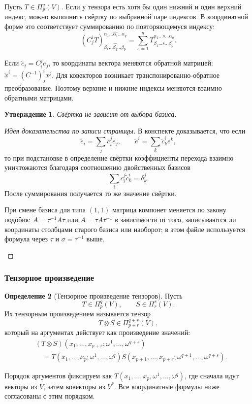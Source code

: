 \documentclass[12pt,a4paper]{article}
\theoremstyle{definition}
\newtheorem{definition}{Определение}[section]
\theoremstyle{plain}
\newtheorem{proposition}[definition]{Утверждение}
\theoremstyle{remark}
\newenvironment{knowledgefix}{\begin{clarifybox}}{\end{clarifybox}}
\newcommand{\Tens}[2]{\Pi^{#2}_{#1}(V)}
\begin{document}
Пусть $T\in\Tens{p}{q}$. Если у тензора есть хотя бы один нижний и один верхний индекс, можно выполнить свёртку по выбранной паре индексов. В координатной форме это соответствует суммированию по повторяющемуся индексу:
\[
    (C^i_j T)^{\alpha_1\ldots \widehat{\alpha_i}\ldots \alpha_q}_{\beta_1\ldots \widehat{\beta_j}\ldots \beta_p}
    =
    \sum_{s=1}^{n}
    T^{\alpha_1\ldots s\ldots \alpha_q}_{\beta_1\ldots s\ldots \beta_p}.
\]
\begin{knowledgefix}
Если \(\tilde e_i=C^j_i e_j\), то координаты вектора меняются обратной матрицей: \(\tilde x^i=(C^{-1})^i_jx^j\). Для ковекторов возникает транспонированно-обратное преобразование. Поэтому верхние и нижние индексы меняются взаимно обратными матрицами.
\end{knowledgefix}

\begin{proposition}
Свёртка не зависит от выбора базиса.
\end{proposition}

\begin{proof}[Идея доказательства по записи страницы]
В конспекте доказывается, что если
\[
    \tilde e_i=\sum_j c_i^j e_j,
    \qquad
    \tilde e^i=\sum_k \tilde c^i_k e^k,
\]
то при подстановке в определение свёртки коэффициенты перехода взаимно уничтожаются благодаря соотношению двойственных базисов
\[
    \sum_i c_i^j\tilde c^i_k=\delta^j_k.
\]
После суммирования получается то же значение свёртки.
\begin{knowledgefix}
При смене базиса для типа \((1,1)\) матрица компонет меняется по закону подобия: \(\widetilde A=\tau^{-1}A\tau\) или \(\widetilde A=\tau A\tau^{-1}\) в зависимости от того, записываются ли координаты столбцами старого базиса или наоборот; в этом файле используется формула через \(\tau\) и \(\sigma=\tau^{-1}\) выше.
\end{knowledgefix}
\end{proof}

\subsubsection*{Тензорное произведение}

\begin{definition}[Тензорное произведение тензоров]
Пусть
\[
    T\in \Tens{p}{q},\qquad S\in \Pi^{s}_{r}(V).
\]
Их тензорным произведением называется тензор
\[
    T\otimes S\in \Pi^{q+s}_{p+r}(V),
\]
который на аргументах действует как произведение значений:
\[
\begin{aligned}
    &(T\otimes S)(x_1,\ldots,x_{p+r};\omega^1,\ldots,\omega^{q+s}) \\
    &\quad =
    T(x_1,\ldots,x_p;\omega^1,\ldots,\omega^q)
    S(x_{p+1},\ldots,x_{p+r};\omega^{q+1},\ldots,\omega^{q+s}).
\end{aligned}
\]
\begin{knowledgefix}
Порядок аргументов фиксируем как \(T(x_1,\ldots,x_p,\omega^1,\ldots,\omega^q)\), где сначала идут векторы из \(V\), затем ковекторы из \(V^*\). Все координатные формулы ниже согласованы с этим порядком.
\end{knowledgefix}
\end{definition}
\end{document}
